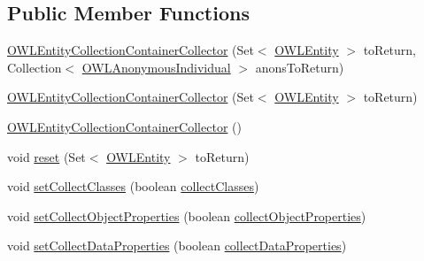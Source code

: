 \subsection*{Public Member Functions}
\begin{DoxyCompactItemize}
\item 
\hyperlink{classuk_1_1ac_1_1manchester_1_1cs_1_1owl_1_1owlapi_1_1_o_w_l_entity_collection_container_collector_a6df31ea8509b062607d46b9ba04ea05b}{O\-W\-L\-Entity\-Collection\-Container\-Collector} (Set$<$ \hyperlink{interfaceorg_1_1semanticweb_1_1owlapi_1_1model_1_1_o_w_l_entity}{O\-W\-L\-Entity} $>$ to\-Return, Collection$<$ \hyperlink{interfaceorg_1_1semanticweb_1_1owlapi_1_1model_1_1_o_w_l_anonymous_individual}{O\-W\-L\-Anonymous\-Individual} $>$ anons\-To\-Return)
\item 
\hyperlink{classuk_1_1ac_1_1manchester_1_1cs_1_1owl_1_1owlapi_1_1_o_w_l_entity_collection_container_collector_a8fbb11abb3a575fbc891dbffd5d51f5e}{O\-W\-L\-Entity\-Collection\-Container\-Collector} (Set$<$ \hyperlink{interfaceorg_1_1semanticweb_1_1owlapi_1_1model_1_1_o_w_l_entity}{O\-W\-L\-Entity} $>$ to\-Return)
\item 
\hyperlink{classuk_1_1ac_1_1manchester_1_1cs_1_1owl_1_1owlapi_1_1_o_w_l_entity_collection_container_collector_aff23af74a7d39e126a4a93f4de2b5133}{O\-W\-L\-Entity\-Collection\-Container\-Collector} ()
\item 
void \hyperlink{classuk_1_1ac_1_1manchester_1_1cs_1_1owl_1_1owlapi_1_1_o_w_l_entity_collection_container_collector_a2494fe69881191e7069fa4e12473fea5}{reset} (Set$<$ \hyperlink{interfaceorg_1_1semanticweb_1_1owlapi_1_1model_1_1_o_w_l_entity}{O\-W\-L\-Entity} $>$ to\-Return)
\item 
void \hyperlink{classuk_1_1ac_1_1manchester_1_1cs_1_1owl_1_1owlapi_1_1_o_w_l_entity_collection_container_collector_a80b4f3f5fbf519c25591558cb2b92d6f}{set\-Collect\-Classes} (boolean \hyperlink{classuk_1_1ac_1_1manchester_1_1cs_1_1owl_1_1owlapi_1_1_o_w_l_entity_collection_container_collector_afa5b3a20a1dd411d8d26e82eeab98404}{collect\-Classes})
\item 
void \hyperlink{classuk_1_1ac_1_1manchester_1_1cs_1_1owl_1_1owlapi_1_1_o_w_l_entity_collection_container_collector_a579623ec181df4a1ac53d142b578efba}{set\-Collect\-Object\-Properties} (boolean \hyperlink{classuk_1_1ac_1_1manchester_1_1cs_1_1owl_1_1owlapi_1_1_o_w_l_entity_collection_container_collector_a52df7cb6897f680e9156a29e62ede9c2}{collect\-Object\-Properties})
\item 
void \hyperlink{classuk_1_1ac_1_1manchester_1_1cs_1_1owl_1_1owlapi_1_1_o_w_l_entity_collection_container_collector_a2f68e650b70339165d2d6a016089b00d}{set\-Collect\-Data\-Properties} (boolean \hyperlink{classuk_1_1ac_1_1manchester_1_1cs_1_1owl_1_1owlapi_1_1_o_w_l_entity_collection_container_collector_a4913cb0fb60217e7750a80e143dc11b5}{collect\-Data\-Properties})

\end{DoxyCompactItemize}
